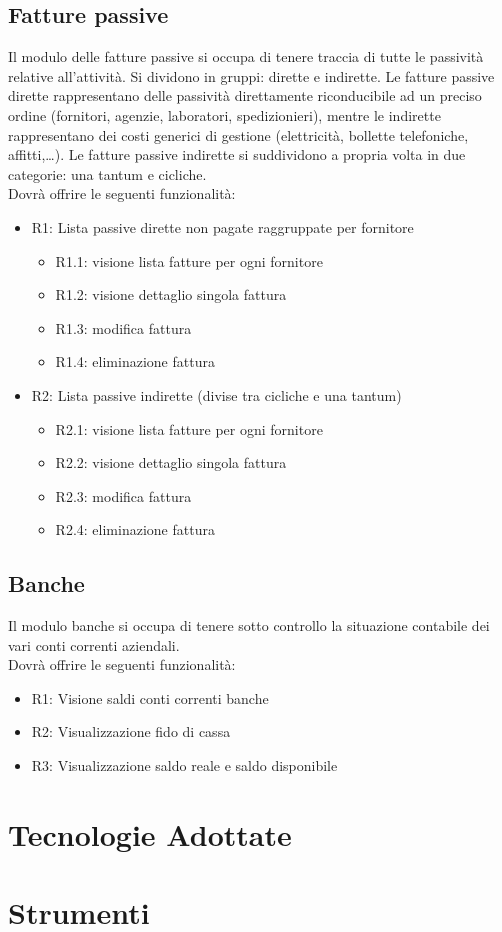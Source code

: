 	\subsection{Fatture passive}
	Il modulo delle fatture passive si occupa di tenere traccia di tutte le passività relative
	all’attività. Si dividono in gruppi: dirette e indirette. Le fatture passive dirette rappresentano
	delle passività direttamente riconducibile ad un preciso ordine (fornitori, agenzie, laboratori,
	spedizionieri), mentre le indirette rappresentano dei costi generici di gestione (elettricità,
	bollette telefoniche, affitti,…). Le fatture passive indirette si suddividono a propria volta in
	due categorie: una tantum e cicliche. \\
	Dovrà offrire le seguenti funzionalità:
	\begin{itemize}
		\item R1: Lista passive dirette non pagate raggruppate per fornitore
		\begin{itemize}
			\item R1.1: visione lista fatture per ogni fornitore
			\item R1.2: visione dettaglio singola fattura
			\item R1.3: modifica fattura
			\item R1.4: eliminazione fattura
		\end{itemize}
		\item R2: Lista passive indirette (divise tra cicliche e una tantum)
		\begin{itemize}
			\item R2.1: visione lista fatture per ogni fornitore
			\item R2.2: visione dettaglio singola fattura
			\item R2.3: modifica fattura
			\item R2.4: eliminazione fattura
		\end{itemize}
	\end{itemize}
	
	\subsection{Banche}
	Il modulo banche si occupa di tenere sotto controllo la situazione contabile dei vari conti
	correnti aziendali.\\
	Dovrà offrire le seguenti funzionalità:
	\begin{itemize}
		\item R1: Visione saldi conti correnti banche
		\item R2: Visualizzazione fido di cassa
		\item R3: Visualizzazione saldo reale e saldo disponibile
	\end{itemize}
		

\section{Tecnologie Adottate}


\section{Strumenti}


